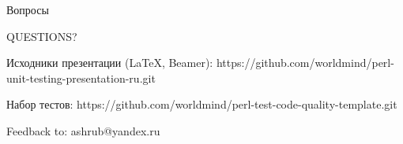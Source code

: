 \documentclass[aspectratio=169]{beamer}
\begin{document}
\begin{frame}{Вопросы}

\begin{center}
\LARGE QUESTIONS?
\end{center}

\begin{block}{Исходники презентации (LaTeX, Beamer):}
https://github.com/worldmind/perl-unit-testing-presentation-ru.git
\end{block}

\begin{block}{Набор тестов:}
https://github.com/worldmind/perl-test-code-quality-template.git
\end{block}

\begin{block}{Feedback to:}
ashrub@yandex.ru
\end{block}

\end{frame}
\end{document}
